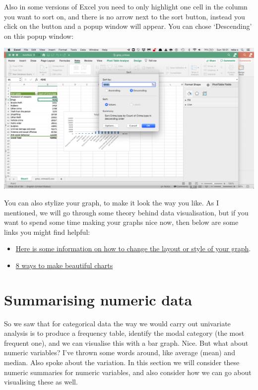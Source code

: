 \documentclass[
]{book}
\providecommand{\tightlist}{%
  \setlength{\itemsep}{0pt}\setlength{\parskip}{0pt}}
\begin{document}
Also in some versions of Excel you need to only highlight one cell in the column you want to sort on, and there is no arrow next to the sort button, instead you click on the button and a popup window will appear. You can chose `Descending' on this popup window:

\includegraphics{imgs/sort_graph_newvs.png}

You can also stylize your graph, to make it look the way you like. As I mentioned, we will go through some theory behind data visualisation, but if you want to spend some time making your graphs nice now, then below are some links you might find helpful:

\begin{itemize}
\tightlist
\item
  \href{https://support.office.com/en-gb/article/Change-the-layout-or-style-of-a-chart-a346e438-d22a-4540-aa87-bce9feb719cf}{Here is some information on how to change the layout or style of your graph}.
\item
  \href{http://www.upslide.net/blog/ways-to-make-beautiful-financial-charts-and-graphs-in-excel/}{8 ways to make beautiful charts}
\end{itemize}

\hypertarget{summarising-numeric-data}{%
\section{Summarising numeric data}\label{summarising-numeric-data}}

So we saw that for categorical data the way we would carry out univariate analysis is to produce a frequency table, identify the modal category (the most frequent one), and we can visualise this with a bar graph. Nice. But what about numeric variables? I've thrown some words around, like average (mean) and median. Also spoke about the variation. In this section we will consider these numeric summaries for numeric variables, and also consider how we can go about visualising these as well.
\end{document}

